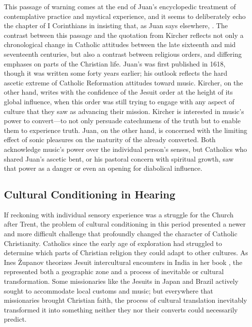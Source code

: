 This passage of warning comes at the end of Juan's encyclopedic treatment of 
contemplative practice and mystical experience, and it seems to deliberately 
echo the  chapter of I Corinthians in insisting that, as Juan 
says elsewhere, .
    \Autocite
    [bk.~2, ch.~22, p.~306: 
    .]
    {JuandelaCruz:Subida}
The contrast between this passage and the quotation from Kircher reflects not 
only a chronological change in Catholic attitudes between the late sixteenth 
and mid seventeenth centuries, but also a contrast between religious orders, 
and differing emphases on parts of the Christian life.
Juan's  was first published in 1618, though 
it was written some forty years earlier; his outlook reflects the hard ascetic 
extreme of Catholic Reformation attitudes toward music.
Kircher, on the other hand, writes with the confidence of the Jesuit order at 
the height of its global influence, when this order was still trying to engage 
with any aspect of culture that they saw as advancing their mission.
Kircher is interested in music's power to convert---to not only persuade 
catechumens of the truth but to enable them to experience truth.
Juan, on the other hand, is concerned with the limiting effect of sonic 
pleasures on the maturity of the already converted.
Both acknowledge music's power over the individual person's senses, but 
Catholics who shared Juan's ascetic bent, or his pastoral concern with 
spiritual growth, saw that power as a danger or even an opening for diabolical 
influence.

\subsection{Cultural Conditioning in Hearing}

If reckoning with individual sensory experience was a struggle for the Church 
after Trent, the problem of cultural conditioning in this period presented a 
newer and more difficult challenge that profoundly changed the character of 
Catholic Christianity.
Catholics since the early age of exploration had struggled to determine which 
parts of Christian religion they could adapt to other cultures.
As Ines \v Zupanov theorizes Jesuit intercultural encounters in India in her book 
, the  represented both a 
geographic zone and a process of inevitable  or cultural 
transformation.%
    \Autocite{Zupanov:MissionaryTropics}
Some missionaries like the Jesuits in Japan and Brazil actively sought to 
accommodate local customs and music; but everywhere that missionaries brought 
Christian faith, the process of cultural translation inevitably transformed it 
into something neither they nor their converts could necessarily predict.
    \Autocites{Bailey:Art}{Waterhouse:EarliestJapaneseContacts}
    {Castagna:JesuitsConversionBrazil}

